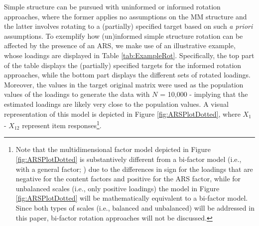 \documentclass[a4paper,man,natbib]{apa6}
\begin{document}
\begin{linenumbers}
Simple structure can be pursued with uninformed or informed rotation approaches, where the former applies no  assumptions on the MM structure and the latter involves rotating to a (partially) specified target based on such \textit{a priori} assumptions.
To exemplify how (un)informed simple structure rotation can be affected by the presence of an ARS, we make use of an illustrative example, whose loadings are displayed in Table \ref{tab:ExampleRot}. 
Specifically, the top part of the table displays the (partially) specified targets for the informed rotation approaches, while the bottom part displays the different sets of rotated loadings. Moreover, the values in the target original matrix  were used as the population values of the loadings to generate the data with $N$ = 10,000 - implying that the estimated loadings are likely very close to the population values.
A visual representation of this model is depicted in Figure \ref{fig:ARSPlotDotted}, where $X_{1}$ - $X_{12}$ represent item responses\footnote{Note that the multidimensional factor model depicted in Figure \ref{fig:ARSPlotDotted} is substantively different from a bi-factor model (i.e., with a general factor; \citealp{holzinger1937bi}) due to the differences in sign for the loadings that are negative for the content factors and positive for the ARS factor, while for unbalanced scales (i.e., only positive loadings) the model in Figure \ref{fig:ARSPlotDotted} will be mathematically equivalent to a bi-factor model. Since both types of scales (i.e., balanced and unbalanced) will be addressed in this paper, bi-factor rotation approaches will not be discussed.
}. 



\end{linenumbers}
\end{document}
